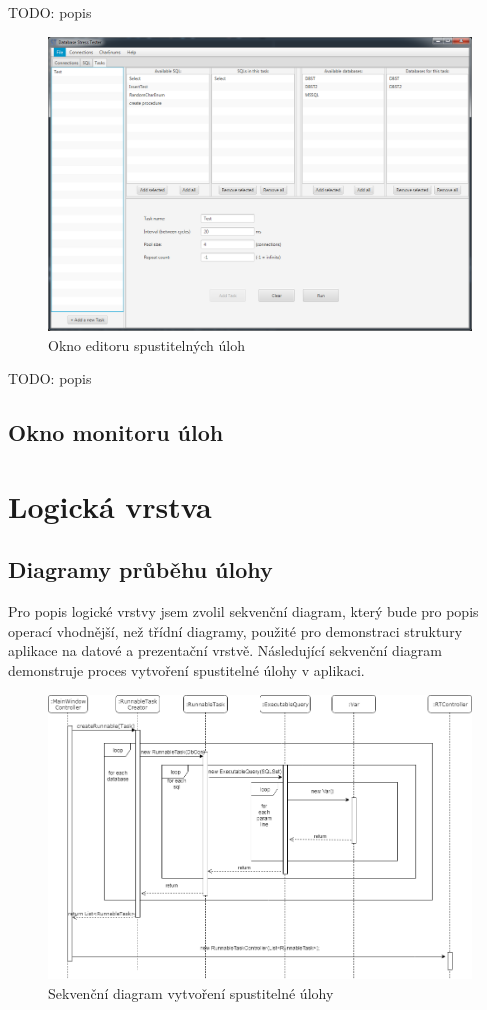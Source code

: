 \documentclass[czech,bachelor,public,dept460,male,cpdeclaration,twoside]{diploma}
\begin{document}
TODO: popis

\newpage
\begin{figure}[!htbp]\centering\includegraphics[width=1.0\textwidth]{Figures/taskeditor.png}\caption{Okno editoru spustitelných úloh}
\end{figure}

TODO: popis

\newpage
\subsection{Okno monitoru úloh}


\section{Logická vrstva} \label{logiclayer}
\subsection{Diagramy průběhu úlohy} \label{logic}
Pro popis logické vrstvy jsem zvolil sekvenční diagram, který bude pro popis operací vhodnější, než třídní diagramy, použité pro demonstraci struktury aplikace na datové a prezentační vrstvě. Následující sekvenční diagram demonstruje proces vytvoření spustitelné úlohy v aplikaci.

\begin{figure}[!htbp]\centering\includegraphics[width=1.0\textwidth]{Figures/rtprocess.png}\caption{Sekvenční diagram vytvoření spustitelné úlohy}
\label{seq1}
\end{figure}
\end{document}
